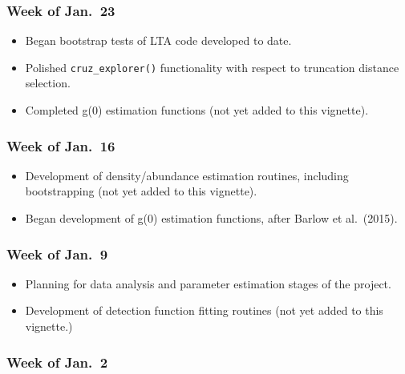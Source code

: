 \documentclass[
]{book}
\begin{document}
\hypertarget{week-of-jan.-23}{%
\subsubsection*{Week of Jan.~23}\label{week-of-jan.-23}}

\begin{itemize}
\item
  Began bootstrap tests of LTA code developed to date.
\item
  Polished \texttt{cruz\_explorer()} functionality with respect to truncation distance selection.
\item
  Completed g(0) estimation functions (not yet added to this vignette).
\end{itemize}

\hypertarget{week-of-jan.-16}{%
\subsubsection*{Week of Jan.~16}\label{week-of-jan.-16}}

\begin{itemize}
\item
  Development of density/abundance estimation routines, including bootstrapping (not yet added to this vignette).
\item
  Began development of g(0) estimation functions, after Barlow et al.~(2015).
\end{itemize}

\hypertarget{week-of-jan.-9}{%
\subsubsection*{Week of Jan.~9}\label{week-of-jan.-9}}

\begin{itemize}
\item
  Planning for data analysis and parameter estimation stages of the project.
\item
  Development of detection function fitting routines (not yet added to this vignette.)
\end{itemize}

\hypertarget{week-of-jan.-2}{%
\subsubsection*{Week of Jan.~2}\label{week-of-jan.-2}}
\end{document}
